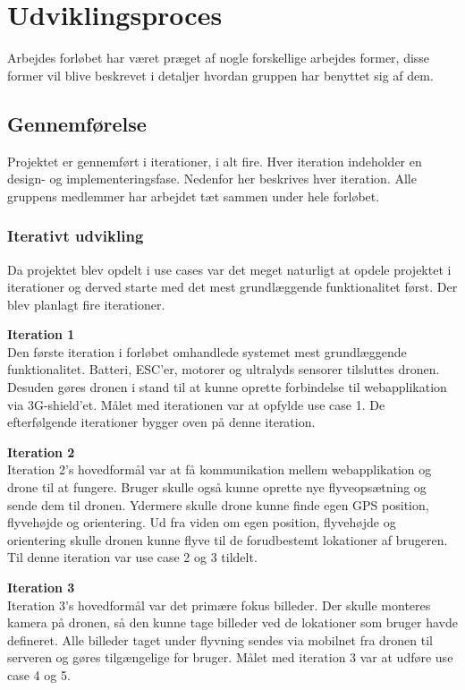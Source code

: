 \chapter{Udviklingsproces}
Arbejdes forløbet har været præget af nogle forskellige arbejdes former, disse former vil blive beskrevet i detaljer hvordan gruppen har benyttet sig af dem.

\section{Gennemførelse}
Projektet er gennemført i iterationer, i alt fire. Hver iteration indeholder en design- og implementeringsfase. Nedenfor her beskrives hver iteration. Alle gruppens medlemmer har arbejdet tæt sammen under hele forløbet.

\subsection{Iterativt udvikling}
Da projektet blev opdelt i use cases var det meget naturligt at opdele projektet i iterationer og derved starte med det mest grundlæggende funktionalitet først. Der blev planlagt fire iterationer. 

\textbf{Iteration 1}\\
Den første iteration i forløbet omhandlede systemet mest grundlæggende funktionalitet. Batteri, ESC'er, motorer og ultralyds sensorer tilsluttes dronen. Desuden gøres dronen i stand til at kunne oprette forbindelse til webapplikation via 3G-shield'et. Målet med iterationen var at opfylde use case 1. De efterfølgende iterationer bygger oven på denne iteration.

\textbf{Iteration 2}\\
Iteration 2's hovedformål var at få kommunikation mellem webapplikation og drone til at fungere. Bruger skulle også kunne oprette nye flyveopsætning  og sende dem til dronen. Ydermere skulle drone kunne finde egen GPS position, flyvehøjde og orientering. Ud fra viden om egen position, flyvehøjde og orientering skulle dronen kunne flyve til de forudbestemt lokationer af brugeren. Til denne iteration var use case 2 og 3 tildelt.

\textbf{Iteration 3}\\
Iteration 3's hovedformål var det primære fokus billeder. Der skulle monteres kamera på dronen, så den kunne tage billeder ved de lokationer som bruger havde defineret. Alle billeder taget under flyvning sendes via mobilnet fra dronen til serveren og gøres tilgængelige for bruger. Målet med iteration 3 var at udføre use case 4 og 5.

